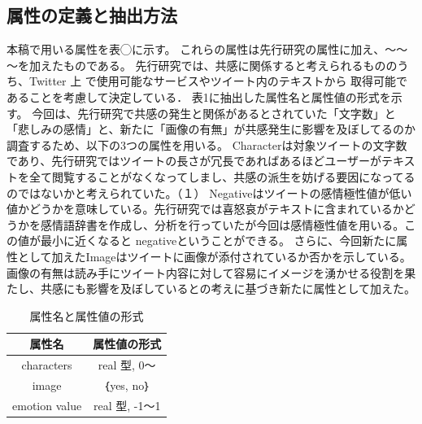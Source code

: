 \documentclass[dvipdfmx]{issj}
\begin{document}
\subsection{属性の定義と抽出方法}  %
本稿で用いる属性を表◯に示す。
これらの属性は先行研究の属性に加え、～～～を加えたものである。
先行研究では、共感に関係すると考えられるもののうち、Twitter 上 で使用可能なサービスやツイート内のテキストから 取得可能であることを考慮して決定している．
表1に抽出した属性名と属性値の形式を示す。
今回は、先行研究で共感の発生と関係があるとされていた「文字数」と「悲しみの感情」と、新たに「画像の有無」が共感発生に影響を及ぼしてるのか調査するため、以下の3つの属性を用いる。
Characterは対象ツイートの文字数であり、先行研究ではツイートの長さが冗長であればあるほどユーザーがテキストを全て閲覧することがなくなってしまし、共感の派生を妨げる要因になってるのではないかと考えられていた。（１）
Negativeはツイートの感情極性値が低い値かどうかを意味している。先行研究では喜怒哀がテキストに含まれているかどうかを感情語辞書を作成し、分析を行っていたが今回は感情極性値を用いる。この値が最小に近くなると negativeということができる。
さらに、今回新たに属性として加えたImageはツイートに画像が添付されているか否かを示している。画像の有無は読み手にツイート内容に対して容易にイメージを湧かせる役割を果たし、共感にも影響を及ぼしているとの考えに基づき新たに属性として加えた。



\begin{table}[htbp]\centering
\caption{属性名と属性値の形式}\label{tbl:font}
\begin{small}
\begin{tabular}{|c|c|} \hline
属性名            & 属性値の形式\\\hline\hline
characters         & real 型, 0～\\\hline
image & ｛yes, no｝\\\hline
emotion value     &  real 型, -1～1\\\hline
\end{tabular}
\end{small}
\end{table}
















\end{document}
